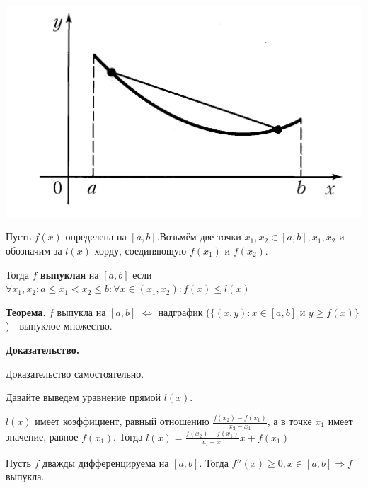 \documentclass[a4paper]{article}
\begin{document}
\includegraphics[scale=1.3]{images/convex_function.jpg}

Пусть $f(x)$ определена на $[a, b]$.Возьмём две точки $x_1, x_2 \in [a,b], x_1, x_2$ и обозначим за $l(x)$ хорду, соединяющую $f(x_1)$ и $f(x_2)$.

Тогда $f$ \textbf{выпуклая} на $[a,b]$ если $\forall x_1, x_2: a \leq x_1 < x_2 \leq b: \forall x \in (x_1, x_2): f(x) \leq l(x)$

\begin{htheorem}
\textbf{Теорема}. $f$ выпукла на $[a,b]$ $\Leftrightarrow$ надграфик ($\{(x, y): x \in [a,b]$ и $y \geq f(x)\}$) - выпуклое множество.
\end{htheorem}

\begin{hproof}
\textbf{Доказательство.}

Доказательство самостоятельно.
\end{hproof}

Давайте выведем уравнение прямой $l(x)$.

$l(x)$ имеет коэффициент, равный отношению $\displaystyle \frac{f(x_2)-f(x_1)}{x_2-x_1}$, а в точке $x_1$ имеет значение, равное $f(x_1)$. Тогда $l(x) = \displaystyle \frac{f(x_2)-f(x_1)}{x_2-x_1} x + f(x_1)$


\begin{htheorem}

Пусть $f$ дважды дифференцируема на $[a, b]$. Тогда $f''(x) \geq 0, x \in [a,b] \Rightarrow f$ выпукла.
\end{htheorem}
\end{document}
